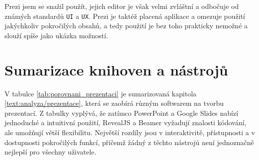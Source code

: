 Prezi jsem se snažil použít, jejich editor je však velmi zvláštní a odbočuje od známých standardů \texttt{UI} a \texttt{UX}.
Prezi je taktéž placená aplikace a omezuje použití jakýchkoliv pokročilých obsahů, a tedy použití je bez toho prakticky nemožné a slouží spíše jako ukázka možností.

\section{Sumarizace knihoven a nástrojů}

V tabulce \ref{tab:porovnani_prezentaci} je sumarizovaná kapitola \ref{text:analyza/prezentace}, která se zaobírá různým softwarem na tvorbu prezentací.
Z tabulky vyplývá, že zatímco PowerPoint a Google Slides nabízí jednoduché a intuitivní použití, RevealJS a Beamer vyžadují znalosti kódování, ale umožňují větší flexibilitu. Největší rozdíly jsou v interaktivitě, přístupnosti a v dostupnosti pokročilých funkcí, přičemž žádný z těchto nástrojů není jednoznačně nejlepší pro všechny uživatele.


\begin{table}[h!]
    \centering
    \caption{Porovnání aplikací pro tvorbu prezentací}
    \label{tab:porovnani_prezentaci}
\end{table}


